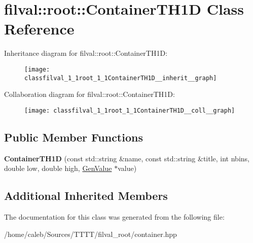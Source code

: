 \hypertarget{classfilval_1_1root_1_1ContainerTH1D}{}\section{filval\+:\+:root\+:\+:Container\+T\+H1D Class Reference}
\label{classfilval_1_1root_1_1ContainerTH1D}


Inheritance diagram for filval\+:\+:root\+:\+:Container\+T\+H1D\+:
\nopagebreak
\begin{figure}[H]
\begin{center}
\leavevmode
\texttt{[image: classfilval\_1\_1root\_1\_1ContainerTH1D\_\_inherit\_\_graph]}
\end{center}
\end{figure}


Collaboration diagram for filval\+:\+:root\+:\+:Container\+T\+H1D\+:
\nopagebreak
\begin{figure}[H]
\begin{center}
\leavevmode
\texttt{[image: classfilval\_1\_1root\_1\_1ContainerTH1D\_\_coll\_\_graph]}
\end{center}
\end{figure}
\subsection*{Public Member Functions}
\begin{DoxyCompactItemize}
\item 
\hypertarget{classfilval_1_1root_1_1ContainerTH1D_abab76d4be12afe805744c293a32103a4}{}\label{classfilval_1_1root_1_1ContainerTH1D_abab76d4be12afe805744c293a32103a4} 
{\bfseries Container\+T\+H1D} (const std\+::string \&name, const std\+::string \&title, int nbins, double low, double high, \hyperlink{classfilval_1_1GenValue}{Gen\+Value} $\ast$value)
\end{DoxyCompactItemize}
\subsection*{Additional Inherited Members}


The documentation for this class was generated from the following file\+:\begin{DoxyCompactItemize}
\item 
/home/caleb/\+Sources/\+T\+T\+T\+T/filval\+\_\+root/container.\+hpp\end{DoxyCompactItemize}
